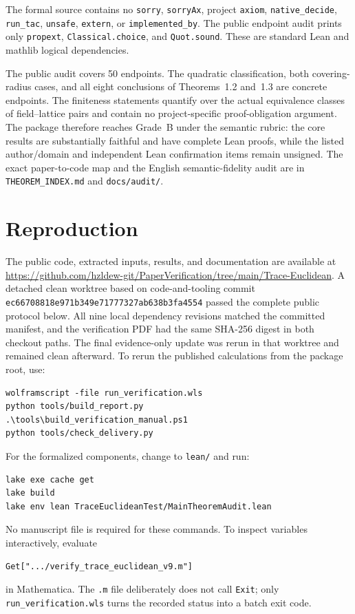 \documentclass[12pt,a4paper]{amsart}
\theoremstyle{remark}
\theoremstyle{definition}
\begin{document}
The formal source contains no \texttt{sorry}, \texttt{sorryAx}, project
\texttt{axiom}, \texttt{native\_decide}, \texttt{run\_tac},
\texttt{unsafe}, \texttt{extern}, or \texttt{implemented\_by}.  The public
endpoint audit prints only \texttt{propext}, \texttt{Classical.choice}, and
\texttt{Quot.sound}.  These are standard Lean and mathlib logical
dependencies.

The public audit covers 50 endpoints.  The quadratic classification, both
covering-radius cases, and all eight conclusions of Theorems~1.2 and~1.3 are
concrete endpoints.  The finiteness statements quantify over the actual
equivalence classes of field--lattice pairs and contain no project-specific
proof-obligation argument.  The package therefore reaches Grade~B under the
semantic rubric: the core results are substantially faithful and have complete
Lean proofs, while the listed author/domain and independent Lean confirmation
items remain unsigned.  The exact paper-to-code map and the English
semantic-fidelity audit are in \nolinkurl{THEOREM_INDEX.md} and
\nolinkurl{docs/audit/}.

\section{Reproduction}

The public code, extracted inputs, results, and documentation are available at
\url{https://github.com/hzldew-git/PaperVerification/tree/main/Trace-Euclidean}.
A detached clean worktree based on code-and-tooling commit
\nolinkurl{ec66708818e971b349e71777327ab638b3fa4554} passed the complete public
protocol below.  All nine local dependency revisions matched the committed
manifest, and the verification PDF had the same SHA-256 digest in both checkout
paths.  The final evidence-only update was rerun in that worktree and remained
clean afterward.
To rerun the published calculations from the package root, use:
\begin{Verbatim}[fontsize=\small,breaklines=true]
wolframscript -file run_verification.wls
python tools/build_report.py
.\tools\build_verification_manual.ps1
python tools/check_delivery.py
\end{Verbatim}
For the formalized components, change to \nolinkurl{lean/} and run:
\begin{Verbatim}[fontsize=\small,breaklines=true]
lake exe cache get
lake build
lake env lean TraceEuclideanTest/MainTheoremAudit.lean
\end{Verbatim}
No manuscript file is required for these commands.  To inspect variables
interactively, evaluate
\begin{Verbatim}[fontsize=\small,breaklines=true]
Get[".../verify_trace_euclidean_v9.m"]
\end{Verbatim}
in Mathematica.  The \texttt{.m} file deliberately does not call
\texttt{Exit}; only \texttt{run\_verification.wls} turns the recorded
status into a batch exit code.
\end{document}
